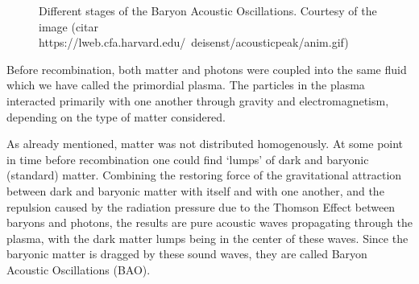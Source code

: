 \begin{figure}[t]
	\centering
	\caption{Different stages of the Baryon Acoustic Oscillations. Courtesy of the image (citar https://lweb.cfa.harvard.edu/~deisenst/acousticpeak/anim.gif)}
\end{figure}

Before recombination, both matter and photons were coupled into the same fluid which we have called the primordial plasma. The particles in the plasma interacted primarily with one another through gravity and electromagnetism, depending on the type of matter considered. 

As already mentioned, matter was not distributed homogenously. At some point in time before recombination one could find `lumps' of dark and baryonic (standard) matter. Combining the restoring force of the gravitational attraction between dark and baryonic matter with itself and with one another, and the repulsion caused by the radiation pressure due to the Thomson Effect between baryons and photons, the results are pure acoustic waves propagating through the plasma, with the dark matter lumps being in the center of these waves. Since the baryonic matter is dragged by these sound waves, they are called Baryon Acoustic Oscillations (BAO).


